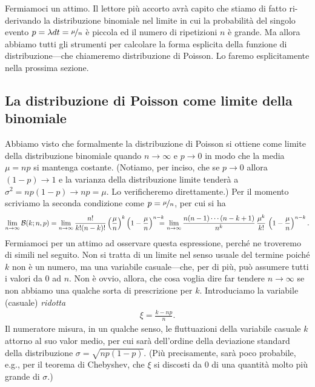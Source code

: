 Fermiamoci un attimo. Il lettore più accorto avrà capito che stiamo di
fatto ri-derivando la distribuzione binomiale nel limite in cui la probabilità
del singolo evento $p = \lambda dt = \nicefrac{\mu}{n}$ è piccola ed il
numero di ripetizioni $n$ è grande. Ma allora abbiamo tutti gli strumenti
per calcolare la forma esplicita della funzione di distribuzione---che
chiameremo distribuzione di Poisson. Lo faremo esplicitamente nella prossima
sezione.


\subsection{La distribuzione di Poisson come limite della binomiale}

Abbiamo visto che formalmente la distribuzione di Poisson si ottiene come
limite della distribuzione binomiale quando $n \rightarrow \infty$ e
$p \rightarrow 0$ in modo che la media $\mu = np$ si mantenga costante.
(Notiamo, per inciso, che se $p \rightarrow 0$ allora $(1 - p) \rightarrow 1$ e
la varianza della distribuzione limite tenderà a
$\sigma^2 = np(1 - p) \rightarrow np = \mu$. Lo verificheremo direttamente.)
Per il momento scriviamo la seconda condizione come $p = \nicefrac{\mu}{n}$,
per cui si ha
\begin{align*}
  \lim_{n \rightarrow \infty} \binomialpdf[n, p]{k} =
  \lim_{n \rightarrow \infty} \binomexpr{n}{k}\left(\frac{\mu}{n}\right)^k
  \left(1 - \frac{\mu}{n}\right)^{n - k} \!\!\!\!\!\! =
  \lim_{n \rightarrow \infty} \frac{n(n-1)\cdots(n-k+1)}{n^k}\,\frac{\mu^k}{k!}\,
  \left(1 - \frac{\mu}{n}\right)^{n - k}.
\end{align*}
Fermiamoci per un attimo ad osservare questa espressione, perché ne troveremo
di simili nel seguito. Non si tratta di un limite nel senso usuale del termine
poiché $k$ non è un numero, ma una variabile casuale---che, per di più,
può assumere tutti i valori da $0$ ad $n$. Non è ovvio, allora, che cosa
voglia dire far tendere $n \rightarrow \infty$ se non abbiamo una qualche sorta
di prescrizione per $k$. Introduciamo la variabile (casuale) \emph{ridotta}
\begin{align*}
  \xi = \frac{k - np}{n}.
\end{align*}
Il numeratore misura, in un qualche senso, le fluttuazioni della variabile
casuale $k$ attorno al suo valor medio, per cui sarà dell'ordine della
deviazione standard della distribuzione $\sigma = \sqrt{np(1 - p)}$. (Più
precisamente, sarà poco probabile, e.g., per il teorema di Chebyshev, che
$\xi$ si discosti da $0$ di una quantità molto più grande di $\sigma$.)
